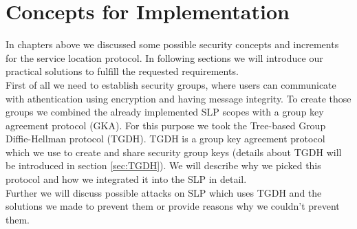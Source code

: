 \newpage
\section{Concepts for Implementation}\label{sec:concepts}
In chapters above we discussed some possible security concepts and increments for the service location protocol. In following sections we will introduce our practical solutions to fulfill the requested requirements.\\
First of all we need to establish security groups, where users can communicate with athentication using encryption and having message integrity. To create those groups we combined the already implemented SLP scopes with a group key agreement protocol (GKA). For this purpose we took the Tree-based Group Diffie-Hellman protocol (TGDH). TGDH is a group key agreement protocol which we use to create and share security group keys (details about TGDH will be introduced in section \ref{sec:TGDH}). We will describe why we picked this protocol and how we integrated it into the SLP in detail.\\
Further we will discuss possible attacks on SLP which uses TGDH and the solutions we made to prevent them or provide reasons why we couldn't prevent them.

